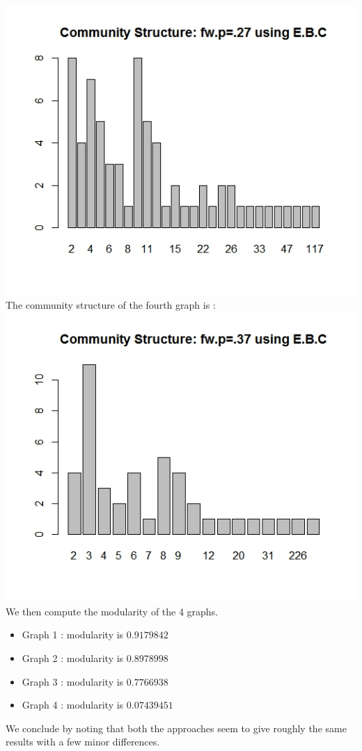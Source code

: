 \documentclass{article}
\begin{document}
\includegraphics[scale=0.4]{pd14} \\
The community structure of the fourth graph is :\\
\includegraphics[scale=0.4]{pd19} \\
We then compute the modularity of the 4 graphs.\\
\begin{itemize}
 \item 
 Graph 1 : modularity is $0.9179842$
 \item 
 Graph 2 : modularity is $0.8978998$
 \item 
 Graph 3 : modularity is $0.7766938$
 \item 
 Graph 4 : modularity is $0.07439451$
\end{itemize}
We conclude by noting that both the approaches seem to give roughly the same results with a few minor differences.
\end{document}
